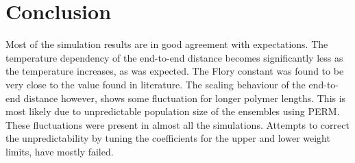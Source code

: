 \section{Conclusion}
Most of the simulation results are in good agreement with expectations. The temperature dependency of the end-to-end distance becomes significantly less as the temperature increases, as was expected. The Flory constant was found to be very close to the value found in literature. The scaling behaviour of the end-to-end distance however, shows some fluctuation for longer polymer lengths. This is most likely due to unpredictable population size of the ensembles using PERM. These fluctuations were present in almost all the simulations. Attempts to correct the unpredictability by tuning the coefficients for the upper and lower weight limits, have mostly failed.
